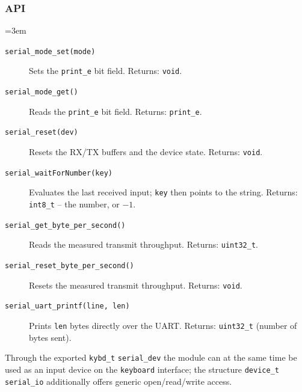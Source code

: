 \subsubsection*{API}
{\sloppy\emergencystretch=3em
\begin{description}
\item[\texttt{serial\_mode\_set(mode)}] Sets the \verb|print_e| bit field.
  Returns: \verb|void|.
\item[\texttt{serial\_mode\_get()}] Reads the \verb|print_e| bit field.
  Returns: \verb|print_e|.
\item[\texttt{serial\_reset(dev)}] Resets the RX/TX buffers and the device
  state. Returns: \verb|void|.
\item[\texttt{serial\_waitForNumber(key)}] Evaluates the last received input;
  \verb|key| then points to the string. Returns: \verb|int8_t| -- the number,
  or $-1$.
\item[\texttt{serial\_get\_byte\_per\_second()}] Reads the measured transmit
  throughput. Returns: \verb|uint32_t|.
\item[\texttt{serial\_reset\_byte\_per\_second()}] Resets the measured transmit
  throughput. Returns: \verb|void|.
\item[\texttt{serial\_uart\_printf(line, len)}] Prints \verb|len| bytes
  directly over the UART. Returns: \verb|uint32_t| (number of bytes sent).
\end{description}
\par}

\noindent Through the exported \verb|kybd_t| \verb|serial_dev| the module can
at the same time be used as an input device on the \verb|keyboard| interface;
the structure \verb|device_t serial_io| additionally offers generic
open/read/write access.

